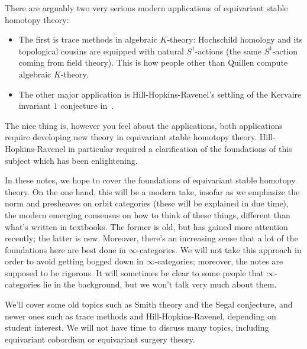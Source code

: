 There are arguably two very serious modern applications of equivariant stable homotopy theory: 

\begin{itemize}
	\item The first is trace methods in algebraic $K$-theory: Hochschild
	homology and its topological cousins are equipped with natural $S^1$-actions (the
	same $S^1$-action coming from field theory). This is how people other than Quillen compute
	algebraic $K$-theory.
	\item The other major application is Hill-Hopkins-Ravenel's settling of the Kervaire invariant $1$ conjecture
	in~\cite{HHR}.
\end{itemize}
The nice thing is, however you feel about the applications, both applications require developing new theory in
equivariant stable homotopy theory. Hill-Hopkins-Ravenel in particular required a clarification of the foundations
of this subject which has been enlightening.

In these notes, we hope to cover the foundations of equivariant stable homotopy theory. On the one hand, this will
be a modern take, insofar as we emphasize the norm and presheaves on orbit categories (these will be explained in
due time), the modern emerging consensus on how to think of these things, different than what's written in
textbooks. The former is old, but has gained more attention recently; the latter is new. Moreover, there's an
increasing sense that a lot of the foundations here are best done in
$\infty$-categories. We will not take this approach in order to avoid
getting bogged down in $\infty$-categories; moreover, the notes are supposed to be rigorous. It will sometimes be
clear to some people that $\infty$-categories lie in the background, but we won't talk very much about them.

We'll cover some old topics such as Smith theory and the Segal conjecture, and newer ones such as trace methods
and Hill-Hopkins-Ravenel, depending on student interest. We will not have time to discuss many topics, including
equivariant cobordism or equivariant surgery theory.
